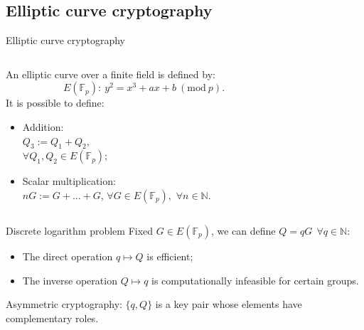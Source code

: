 \documentclass[slidescentered]{beamer}
\begin{document}
		\subsection{Elliptic curve cryptography}
		\begin{frame}{Elliptic curve cryptography}
			\begin{columns}
				\begin{column}{0.5\linewidth}
					An elliptic curve over a finite field is defined by: 
					$$E(\mathbb{F}_p): \ y^2 = x^3 + ax + b \ (\text{mod} \ p).$$
					It is possible to define:
					\begin{itemize}
						\item Addition: \\
						$Q_3 := Q_1 + Q_2,$ 
						\\$\forall Q_1, Q_2 \in E(\mathbb{F}_p)$;
						\item Scalar multiplication: \\
						$nG := G + ... + G$, $\forall G \in E(\mathbb{F}_p),$ $\forall n \in \mathbb{N}$.
					\end{itemize}
			\end{column}
			\begin{column}{0.6\linewidth}
			\end{column}
		\end{columns}
	\end{frame}

    
    \begin{frame}{Discrete logarithm problem}
    	Fixed $G \in E(\mathbb{F}_p)$, we can define $Q = qG \ \ \forall q \in \mathbb{N}$:
    	\begin{itemize}
    		\item The direct operation $q \mapsto Q$ is efficient;
    		\item The inverse operation $Q \mapsto q$ is computationally infeasible for certain groups.
    	\end{itemize}
    	
    	\bigskip
    	\noindent
    	Asymmetric cryptography: $\{q, Q\}$ is a key pair whose elements have complementary roles.
	\end{frame}
    
\end{document}
